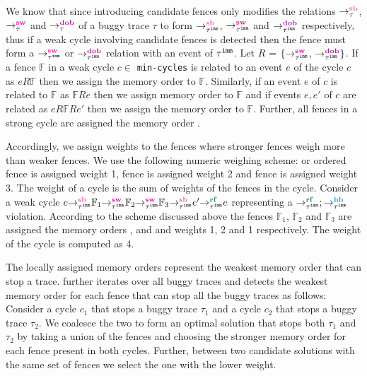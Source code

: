 We know that since introducing candidate fences only modifies
the relations $\setSB$, $\setSW$ and $\setDOB$ of a buggy trace
$\tau$ to form $\seqb{\imm{\tau}}{}{}$, $\sw{\imm{\tau}}{}{}$ 
and $\dob{\imm{\tau}}{}{}$ respectively, thus if a weak cycle
involving candidate fences is detected then the fence must form
a $\sw{\imm{\tau}}{}{}$ or $\dob{\imm{\tau}}{}{}$ relation with
an event of ${\tau}^{\mathtt{imm}}$. 
%
Let $R$ = $\{ \sw{\imm{\tau}}{}{}$, $\dob{\imm{\tau}}{}{} \}$. 
%
If a fence $\mathbb{F}$ in a weak cycle $c \in$ {\tt min-cycles} 
is related to an event $e$ of the cycle $c$ as $eR\mathbb{F}$ 
then we assign the memory order \acq to $\mathbb{F}$.
%
Similarly, if an event $e$ of $c$ is related to $\mathbb{F}$ as 
$\mathbb{F}Re$ then we assign memory order \rel to $\mathbb{F}$ 
and if events $e,e'$ of $c$ are related as $eR\mathbb{F}Re'$ then 
we assign the memory order \acqrel to $\mathbb{F}$.
%
Further, all fences in a strong cycle are assigned the memory
order \sc.

Accordingly, we assign weights to the fences where stronger 
fences weigh more than weaker fences. We use the following
numeric weighing scheme: \rel or \acq ordered fence is assigned
weight 1, \acqrel fence is assigned weight 2 and \sc fence is
assigned weight 3. The weight of a cycle is the sum of weights
of the fences in the cycle.
%
Consider a weak cycle
$\seqb{\imm{\tau}}{e}{\sw{\imm{\tau}}{\mathbb{F}_1}{\sw{\imm{\tau}}{\mathbb{F}_2}{\seqb{\imm{\tau}}{\mathbb{F}_3}{\rf{\imm{\tau}}{e'}{e}}}}}$
representing a $\rf{\imm{\tau}}{}{};\hb{\imm{\tau}}{}{}$ 
violation. According to the scheme discussed above the fences
$\mathbb{F}_1$, $\mathbb{F}_2$ and $\mathbb{F}_3$ are assigned 
the memory orders \rel, \acqrel and \acq and weights 1, 2 and 
1 respectively. The weight of the cycle is computed as 4.

The locally assigned memory orders represent the weakest 
memory order that can stop a trace. 
\ourtechnique further iterates over all buggy traces and 
detects the weakest memory order for each fence that can stop 
all the buggy traces as follows: 
%
Consider a cycle $c_1$ that stops a buggy trace $\tau_1$ and a 
cycle $c_2$ that stops a buggy trace $\tau_2$. We coalesce the
two to form an optimal solution that stops both $\tau_1$ and
$\tau_2$ by taking a union of the fences and choosing the
stronger memory order for each fence present in both cycles.
%
Further, between two candidate solutions with the same set of
fences we select the one with the lower weight.

